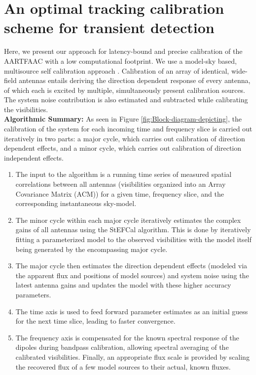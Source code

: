 \documentclass{aa}
\begin{document}
\section{\label{sec:An-Optimal,-tracking}An optimal tracking calibration
scheme for transient detection}

Here,  we present our  approach for  latency-bound and  precise calibration  of the
AARTFAAC  with  a  low  computational  footprint.  We  use  a  model-sky  based,
multisource   self   calibration   approach   \citep{wijnholds2009multisource}.
Calibration of an  array of identical, wide-field antennas  entails deriving the
direction  dependent response  of every  antenna, of which each is  excited by
multiple,  simultaneously   present  calibration  sources.    The  system  noise
contribution   is  also   estimated  and   subtracted  while   calibrating  the
visibilities.\\    \textbf{Algorithmic    Summary:}    As   seen    in    Figure
\ref{fig:Block-diagram-depicting},  the  calibration  of  the  system  for  each
incoming time  and frequency slice  is carried out  iteratively in two  parts: a
major cycle, which carries out  calibration of direction dependent effects, and a
minor cycle, which carries out calibration of direction independent effects.
\begin {enumerate}
\item {The  input to the algorithm  is a running time series  of measured spatial
  correlations  between  all  antennas  (visibilities organized  into  an  Array
  Covariance  Matrix  (ACM)) for  a  given time, frequency  slice, and  the
  corresponding instantaneous sky-model.}
\item {The minor cycle within each major cycle iteratively estimates the complex
  gains        of       all        antennas       using        the       StEFCal
  \citep{salvini2014stef,salvini2014stefursi}   algorithm.   This  is   done  by
  iteratively fitting  a parameterized model to the  observed visibilities with
  the model itself being generated by the encompassing major cycle.}
\item {The major  cycle then estimates the direction  dependent effects (modeled
  via the apparent  flux and positions of model sources)  and system noise using
  the latest  antenna gains and updates the  model with these  higher accuracy
  parameters.}
\item {The time  axis is used to feed forward parameter  estimates as an initial
  guess for the next time slice, leading to faster convergence.}
\item {The frequency axis is compensated  for the known spectral response of the
  dipoles  during  bandpass  calibration,  allowing spectral  averaging  of  the
  calibrated  visibilities. Finally, an  appropriate flux  scale is  provided by
  scaling  the recovered  flux of  a few  model sources  to their  actual, known
  fluxes.}
\end{enumerate}
\end{document}
